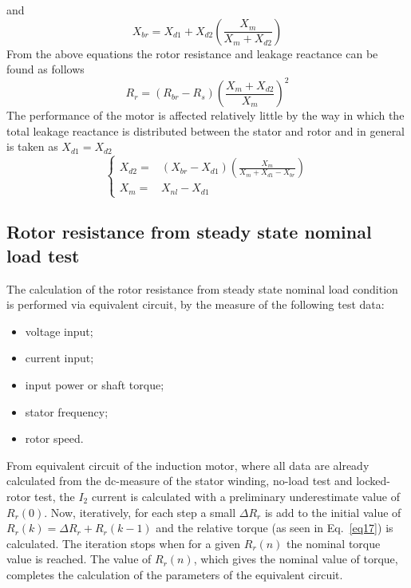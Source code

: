 \documentclass[11pt,a4paper,oneside]{book}
\numberwithin{equation}{section}
\theoremstyle{it}
\theoremstyle{definition}
\begin{document}
and 
\begin{equation} \label{eq26}
	X_{br} = X_{d1} + X_{d2} \left( \frac{X_m}{X_m+X_{d2}} \right)
\end{equation}
From the above equations the rotor resistance and leakage reactance can be found as follows
\begin{equation} \label{eq27}
	R_{r} = \left(R_{br} - R_{s} \right) \left( \frac{X_m+X_{d2}}{X_m} \right)^2
\end{equation}
The performance of the motor is affected relatively little by the way in which the total leakage reactance is distributed between the stator and rotor and in general is taken as $X_{d1} = X_{d2}$
\begin{equation} \label{eq27}
	\left\{
	\begin{aligned} 
		X_{d2} = & \left(X_{br} - X_{d1}\right) \left( \frac{X_m}{X_m+X_{d1}-X_{br}} \right) \\[6pt]
		X_{m} =  & X_{nl} - X_{d1}
	\end{aligned}\right.
\end{equation}


\subsection{Rotor resistance from steady state nominal load test}
The calculation of the rotor resistance from steady state nominal load condition is performed via equivalent circuit, by the measure of the following test data:
\begin{itemize}
	\item voltage input;
	\item current input;
	\item input power or shaft torque;
	\item stator frequency;
	\item rotor speed.
\end{itemize}
From equivalent circuit of the induction motor, where all data are already calculated from the dc-measure of the stator winding, no-load test and locked-rotor test, the $I_2$ current is calculated with a preliminary underestimate value of $R_r(0)$. Now, iteratively, for each step a small $\Delta R_r$ is add to the initial value of $R_r(k)=\Delta R_r+R_r(k-1)$ and the relative torque (as seen in Eq.~\eqref{eq17}) is calculated. The iteration stops when for a given $R_r(n)$ the nominal torque value is reached. The value of $R_r(n)$, which gives the nominal value of torque, completes the calculation of the parameters of the equivalent circuit.
\end{document}
